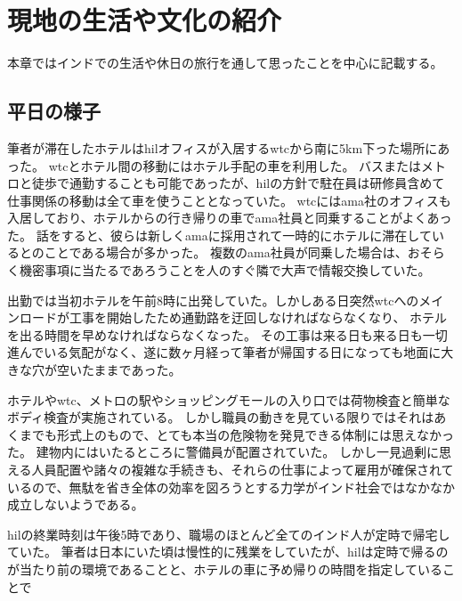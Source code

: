 \chapter{現地の生活や文化の紹介}
本章ではインドでの生活や休日の旅行を通して思ったことを中心に記載する。
\section{平日の様子}
筆者が滞在したホテルは\acrshort{hil}オフィスが入居する\acrlong{wtc}から南に5km下った場所にあった。
\acrshort{wtc}とホテル間の移動にはホテル手配の車を利用した。
バスまたはメトロと徒歩で通勤することも可能であったが、\acrshort{hil}の方針で駐在員は研修員含めて仕事関係の移動は全て車を使うこととなっていた。
\acrshort{wtc}には\acrshort{ama}社のオフィスも入居しており、ホテルからの行き帰りの車で\acrshort{ama}社員と同乗することがよくあった。
話をすると、彼らは新しく\acrshort{ama}に採用されて一時的にホテルに滞在しているとのことである場合が多かった。
複数の\acrshort{ama}社員が同乗した場合は、おそらく機密事項に当たるであろうことを人のすぐ隣で大声で情報交換していた。
\par
出勤では当初ホテルを午前8時に出発していた。しかしある日突然\acrshort{wtc}へのメインロードが工事を開始したため通勤路を迂回しなければならなくなり、
ホテルを出る時間を早めなければならなくなった。
その工事は来る日も来る日も一切進んでいる気配がなく、遂に数ヶ月経って筆者が帰国する日になっても地面に大きな穴が空いたままであった。
\par
ホテルや\acrshort{wtc}、メトロの駅やショッピングモールの入り口では荷物検査と簡単なボディ検査が実施されている。
しかし職員の動きを見ている限りではそれはあくまでも形式上のもので、とても本当の危険物を発見できる体制には思えなかった。
建物内にはいたるところに警備員が配置されていた。
しかし一見過剰に思える人員配置や諸々の複雑な手続きも、それらの仕事によって雇用が確保されているので、無駄を省き全体の効率を図ろうとする力学がインド社会ではなかなか成立しないようである。
\par
\acrshort{hil}の終業時刻は午後5時であり、職場のほとんど全てのインド人が定時で帰宅していた。
筆者は日本にいた頃は慢性的に残業をしていたが、\acrshort{hil}は定時で帰るのが当たり前の環境であることと、ホテルの車に予め帰りの時間を指定していることで
